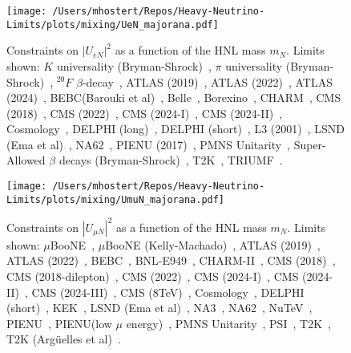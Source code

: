 \documentclass{revtex4-1}%
\begin{document}
%
\normalsize%


\begin{figure}[h!]%
\centering%
\texttt{[image: /Users/mhostert/Repos/Heavy-Neutrino-Limits/plots/mixing/UeN\_majorana.pdf]}%
\caption{Constraints on $|U_{e N}|^2$ as a function of the HNL mass $m_N$. Limits shown: $K$ universality (Bryman-Shrock)~\cite{Bryman:2019bjg}, $\pi$ universality (Bryman-Shrock)~\cite{Bryman:2019bjg}, $^{20}F$ $\beta$-decay~\cite{Deutsch:1990ut}, ATLAS (2019)~\cite{ATLAS:2019kpx}, ATLAS (2022)~\cite{ATLAS:2022atq}, ATLAS (2024)~\cite{ATLAS:2024erm}, BEBC(Barouki et al)~\cite{Barouki:2022bkt}, Belle~\cite{Belle:2013ytx}, Borexino~\cite{Borexino:2013bot}, CHARM~\cite{CHARM:1985nku}, CMS (2018)~\cite{CMS:2018iaf}, CMS (2022)~\cite{CMS:2022fut}, CMS (2024-I)~\cite{CMS:2024ake}, CMS (2024-II)~\cite{CMS:2024xdq}, Cosmology~\cite{Sabti:2020yrt}, DELPHI (long)~\cite{DELPHI:1996qcc}, DELPHI (short)~\cite{DELPHI:1996qcc}, L3 (2001)~\cite{L3:2001zfe}, LSND (Ema et al)~\cite{Ema:2023buz}, NA62~\cite{NA62:2020mcv}, PIENU (2017)~\cite{PIENU:2017wbj}, PMNS Unitarity~\cite{Blennow:2023mqx}, Super-Allowed $\beta$ decays (Bryman-Shrock)~\cite{Bryman:2019bjg}, T2K~\cite{T2K:2019jwa}, TRIUMF~\cite{Britton:1992xv}.}%
\end{figure}

%


\begin{figure}[h!]%
\centering%
\texttt{[image: /Users/mhostert/Repos/Heavy-Neutrino-Limits/plots/mixing/UmuN\_majorana.pdf]}%
\caption{Constraints on $|U_{\mu N}|^2$ as a function of the HNL mass $m_N$. Limits shown: $\mu$BooNE~\cite{MicroBooNE:2023icy}, $\mu$BooNE (Kelly-Machado)~\cite{Kelly:2021xbv}, ATLAS (2019)~\cite{ATLAS:2019kpx}, ATLAS (2022)~\cite{ATLAS:2022atq}, BEBC~\cite{WA66:1985mfx}, BNL-E949~\cite{E949:2014gsn}, CHARM-II~\cite{CHARMII:1994jjr}, CMS (2018)~\cite{CMS:2018iaf}, CMS (2018-dilepton)~\cite{CMS:2018jxx}, CMS (2022)~\cite{CMS:2022fut}, CMS (2024-I)~\cite{CMS:2024ake}, CMS (2024-II)~\cite{CMS:2024xdq}, CMS (2024-III)~\cite{CMS:2024ita}, CMS (8TeV)~\cite{CMS:2016aro}, Cosmology~\cite{Sabti:2020yrt}, DELPHI (short)~\cite{DELPHI:1996qcc}, KEK~\cite{Bryman:2019bjg}, LSND (Ema et al)~\cite{Ema:2023buz}, NA3~\cite{NA3:1986ahv}, NA62~\cite{NA62:2021bji}, NuTeV~\cite{NuTeV:1999kej}, PIENU~\cite{PIENU:2019usb}, PIENU(low $\mu$ energy)~\cite{PIENU:2019usb}, PMNS Unitarity~\cite{Blennow:2023mqx}, PSI~\cite{Daum:1987bg}, T2K~\cite{T2K:2019jwa}, T2K (Arg\"uelles et al)~\cite{Arguelles:2021dqn}.}%
\end{figure}
\end{document}
